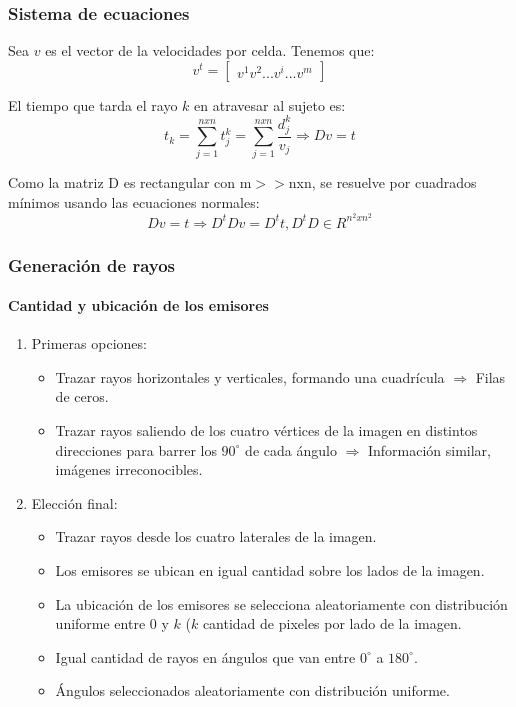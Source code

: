 \documentclass[11pt]{beamer}
\begin{document}
\begin{frame}
\frametitle{Sistema de ecuaciones}
\par Sea $v$ es el vector de la velocidades por celda. Tenemos que:
$$
v^t=\left[
\begin{array}{c}
v^1 
v^2 
... 
v^i 
... 
v^{m} 
\end{array}
\right]
$$
\par El tiempo que tarda el rayo $k$ en atravesar al sujeto es:
$$t_{k}=\sum_{j=1}^{nxn}t^k_{j} = \sum_{j=1}^{nxn} \dfrac{d^k_j}{v_{j}} \Rightarrow Dv=t
$$
\par Como la matriz D es rectangular con m$>>$nxn, se resuelve por cuadrados mínimos usando las ecuaciones normales:
$$
Dv=t \Rightarrow D^tDv=D^tt, D^tD \in R^{n^2 x n^2}
$$
\end{frame}


\begin{frame}
\frametitle{Generación de rayos}
\framesubtitle{Cantidad y ubicación de los emisores}

\begin{enumerate}
    \item Primeras opciones:
    \begin{itemize}
        \item Trazar rayos horizontales y verticales, formando una cuadrícula $\Rightarrow$ Filas de ceros.
        \item Trazar rayos saliendo de los cuatro vértices de la imagen en distintos direcciones para barrer los $90^{\circ}$ de cada ángulo $\Rightarrow$ Información similar, imágenes irreconocibles.
    \end{itemize}
    \item Elección final:
    \begin{itemize}
        
    \item Trazar rayos desde los cuatro laterales de la imagen.
    \item Los emisores se ubican en igual cantidad sobre los lados de la imagen.
    \item La ubicación de los emisores se selecciona aleatoriamente con distribución uniforme entre $0$ y $k$ ($k$ cantidad de pixeles por lado de la imagen.
    \item Igual cantidad de rayos en ángulos que van entre $0^{\circ}$ a $180^{\circ}$.
    \item Ángulos seleccionados aleatoriamente con distribución uniforme.
    \end{itemize}

\end{enumerate}

\end{frame}
\end{document}
